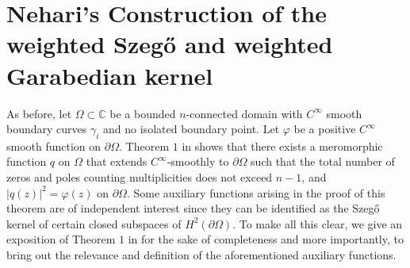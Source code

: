 \documentclass[11pt, reqno]{amsart}
\numberwithin{equation}{section}
\newcommand{\pa}{\partial}
\newcommand{\Om}{\Omega}
\begin{document}
	
	\section{Nehari's Construction of the weighted Szeg\H{o} and weighted Garabedian kernel}

As before, let $\Om\subset\mathbb{C}$ be a bounded $n$-connected domain with $C^{\infty}$ smooth boundary curves $\gamma_i$ and no isolated boundary point. Let $\varphi$ be a positive $C^{\infty}$ smooth function on $\partial\Om$. Theorem $1$ in \cite{Nehari} shows that there exists a meromorphic function $q$ on $\Omega$ that extends $C^{\infty}$-smoothly to $\pa \Omega$ such that the total number of zeros and poles counting multiplicities does not exceed $n-1$, and $\vert q(z) \vert^2 = \varphi(z)$ on $\pa \Om$. Some auxiliary functions arising in the proof of this theorem are of independent interest since they can be identified as the Szeg\H{o} kernel of certain closed subspaces of $H^2(\pa \Omega)$. To make all this clear, we give an exposition of Theorem $1$ in \cite{Nehari} for the sake of completeness and more importantly, to bring out the relevance and definition of the aforementioned auxiliary functions.

\medskip
\end{document}
